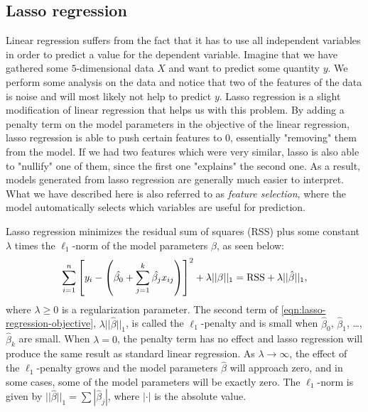 \subsection{Lasso regression}
Linear regression suffers from the fact that it has to use all independent variables in order to predict a value for the dependent variable. Imagine that we have gathered some $5$-dimensional data $X$ and want to predict some quantity $y$. We perform some analysis on the data and notice that two of the features of the data is noise and will most likely not help to predict $y$. Lasso regression is a slight modification of linear regression that helps us with this problem. By adding a penalty term on the model parameters in the objective of the linear regression, lasso regression is able to push certain features to 0, essentially "removing" them from the model. If we had two features which were very similar, lasso is also able to "nullify" one of them, since the first one "explains" the second one. As a result, models generated from lasso regression are generally much easier to interpret. What we have described here is also referred to as \textit{feature selection}, where the model automatically selects which variables are useful for prediction.

Lasso regression minimizes the residual sum of squares (RSS) plus some constant $\lambda$ times the $\ell_1$-norm of the model parameters $\beta$, as seen below:
\begin{align}
    \sum\limits_{i=1}^{n}{\left[y_i - \left(\hat{\beta_0} +  \sum\limits_{j=1}^{k}{\hat{\beta_j}x_{ij}}\right)\right]^2} + \lambda ||\beta||_1 = \text{RSS} + \lambda ||\hat{\beta}||_1,
    \label{eqn:lasso-regression-objective}
\end{align}
where $\lambda \geq 0$ is a regularization parameter. The second term of \cref{eqn:lasso-regression-objective}, $\lambda ||\hat{\beta}||_1$, is called the $\ell_1$-penalty and is small when $\hat{\beta}_0$, $\hat{\beta}_1$, \ldots, $\hat{\beta}_k$ are small. When $\lambda = 0$, the penalty term has no effect and lasso regression will produce the same result as standard linear regression. As $\lambda \rightarrow \infty$, the effect of the $\ell_1$-penalty grows and the model parameters $\hat{\beta}$ will approach zero, and in some cases, some of the model parameters will be exactly zero. The $\ell_1$-norm is given by $||\hat{\beta}||_1 = \sum |\hat{\beta}_j|$, where $|\cdot|$ is the absolute value.

